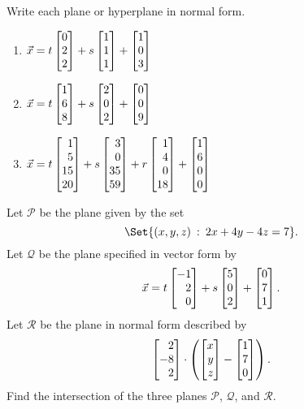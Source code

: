 \begin{exercises}
\begin{problist}
		\prob Write each plane or hyperplane in normal form.
		\begin{enumerate}
			\item $\vec x = t\mat{0\\2\\2}+s\mat{1\\1\\1}+\mat{1\\0\\3}$
			\item $\vec x = t\mat{1\\6\\8}+s\mat{2\\0\\2}+\mat{0\\0\\9}$
			\item $\vec x = t\mat{1\\5\\15\\20}+s\mat{3\\0\\35\\59}+
			r\mat{1\\4\\0\\18}+\mat{1\\6\\0\\0}$
		\end{enumerate}

		\prob
		Let $\mathcal P$ be the plane given by the set
		\[
			\Set{(x,y,z)\given 2x+4y-4z=7}.
		\]
		Let $\mathcal Q$ be the plane specified in vector form by
		\[
			\vec x = t\mat{-1\\2\\0}+s\mat{5\\0\\2}+\mat{0\\7\\1}.
		\]
		Let $\mathcal R$ be the plane in normal form described by
		\[
			\mat{2\\-8\\2} \cdot \left(\mat{x\\y\\z}-\mat{1\\7\\0}\right).
		\]
		Find the intersection of the three planes $\mathcal P$, $\mathcal Q$, and $\mathcal R$.

	\end{problist}
\end{exercises}
